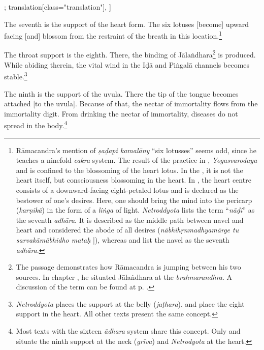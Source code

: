 \begin{alignment}[
  texts=edition[class="edition"];
  translation[class="translation"],
  ]
\begin{translation}
\begin{tlate}[p30_03]
     The seventh is the support of the heart form. The six lotuses [become] upward facing [and] blossom from the restraint of the breath in this location.\footnote{Rāmacandra's mention of \textit{ṣaḍapi kamalāny} ``six lotusses'' seems odd, since he teaches a ninefold \textit{cakra} system. The result of the practice in , \textit{Yogasvarodaya} and  is confined to the blossoming of the heart lotus. In the , it is not the heart itself, but consciousness blossoming in the heart. In , the heart centre consists of a downward-facing eight-petaled lotus and is declared as the bestower of one's desires. Here, one should bring the mind into the pericarp (\textit{karṇikā}) in the form of a \textit{liṅga} of light. \textit{Netroddyota} lists the term ``\textit{nāḍi}'' as the seventh \textit{adhāra}. It is described as the middle path between navel and heart and considered the abode of all desires (\textit{nābhihṛnmadhyamārge tu sarvakāmābhidho mataḥ} |), whereas  and  list the navel as the seventh \textit{adhāra}.}

      The throat support is the eighth. There, the binding of Jālaṅdhara\footnote{The passage demonstrates how Rāmacandra is jumping between his two sources. In chapter , he situated Jālaṅdhara at the \textit{brahmarandhra}. A discussion of the term can be found at p. \pageref{cakra8trans}.} is produced. While abiding therein, the vital wind in the Iḍā and Piṅgalā channels becomes stable.\footnote{\textit{Netroddyota} places the support at the belly (\textit{jaṭhara}).  and  place the eight support in the heart. All other texts present the same concept.}

      The ninth is the support of the uvula. There the tip of the tongue becomes attached [to the uvula]. Because of that, the nectar of immortality flows from the immortality digit. From drinking the nectar of immortality, diseases do not spread in the body.\footnote{Most texts with the sixteen \textit{ādhara} system share this concept. Only  and  situate the ninth support at the neck (\textit{grīva}) and \textit{Netrodyota} at the heart.}      
     \flushpage
     \end{tlate}
  \end{translation}
\end{alignment}
\pagebreak %
